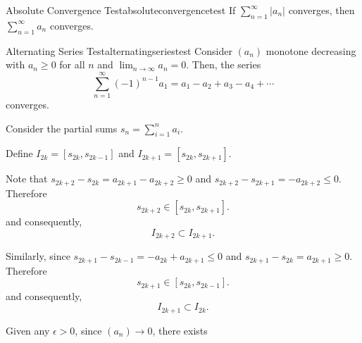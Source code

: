 \begin{thm}{Absolute Convergence Test}{absoluteconvergencetest}
	If \(\sum_{n=1}^\infty |a_n|\) converges, then \(\sum_{n=1}^\infty a_n\) converges.
\end{thm}

\begin{thm}{Alternating Series Test}{alternatingseriestest}
	Consider \((a_n)\) monotone decreasing with \(a_n \geq 0\) for all \(n\) and \(\lim_{n\to\infty} a_n = 0\). Then, the series \[
		\sum_{n=1}^\infty (-1)^{n-1}a_1 = a_1 - a_2 + a_3 - a_4 + \cdots
	\]
	converges.
\end{thm}

\begin{dem}{}{}
	Consider the partial sums \(s_n = \sum_{i=1}^n a_i\). 

	Define \(I_{2k} = [s_{2k}, s_{2k-1}]\) and \(I_{2k+1} = [s_{2k}, s_{2k+1}]\).

	Note that \(s_{2k+2} - s_{2k} = a_{2k+1} - a_{2k+2} \geq 0\) and \(s_{2k+2} - s_{2k+1} = -a_{2k+2} \leq 0\). Therefore \[
		s_{2k+2} \in [s_{2k}, s_{2k+1}].
	\] and consequently, \[
		I_{2k+2} \subset I_{2k+1}.
	\]

	Similarly, since \(s_{2k+1} - s_{2k-1} = - a_{2k} + a_{2k+1} \leq 0\) and \(s_{2k+1} - s_{2k} = a_{2k+1} \geq 0\). Therefore \[
		s_{2k+1} \in [s_{2k}, s_{2k-1}].
	\] and consequently, \[
		I_{2k+1} \subset I_{2k}.
	\]

	Given any \(\epsilon > 0\), since \((a_n) \to 0\), there exists 
\end{dem}
